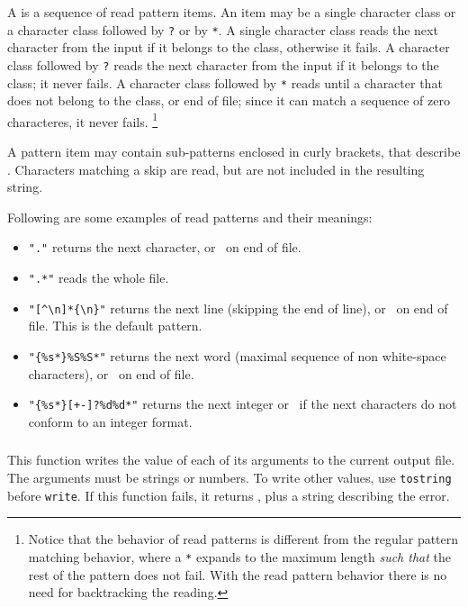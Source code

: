 A  is a sequence of read pattern items.
An item may be a single character class
or a character class followed by \verb'?' or by \verb'*'.
A single character class reads the next character from the input
if it belongs to the class, otherwise it fails.
A character class followed by \verb'?' reads the next character
from the input if it belongs to the class;
it never fails.
A character class followed by \verb'*' reads until a character that
does not belong to the class, or end of file;
since it can match a sequence of zero characteres, it never fails.%
\footnote{
Notice that the behavior of read patterns is different from
the regular pattern matching behavior,
where a \verb'*' expands to the maximum length {\em such that\/}
the rest of the pattern does not fail.
With the read pattern behavior
there is no need for backtracking the reading.
}

A pattern item may contain sub-patterns enclosed in curly brackets,
that describe .
Characters matching a skip are read,
but are not included in the resulting string.

Following are some examples of read patterns and their meanings:
\begin{itemize}
\item \verb|"."| returns the next character, or \nil\ on end of file.
\item \verb|".*"| reads the whole file.
\item \verb|"[^\n]*{\n}"| returns the next line
(skipping the end of line), or \nil\ on end of file.
This is the default pattern.
\item \verb|"{%s*}%S%S*"| returns the next word
(maximal sequence of non white-space characters),
or \nil\ on end of file.
\item \verb|"{%s*}[+-]?%d%d*"| returns the next integer
or \nil\ if the next characters do not conform to an integer format.
\end{itemize}

\subsubsection*{}

This function writes the value of each of its arguments to the
current output file.
The arguments must be strings or numbers.
To write other values,
use \verb|tostring| before \verb|write|.
If this function fails, it returns \nil,
plus a string describing the error.

